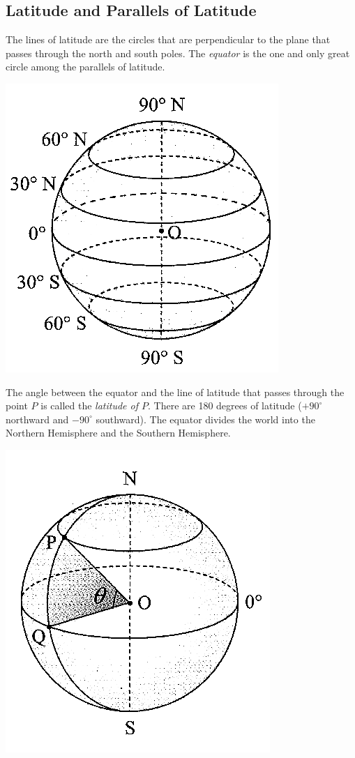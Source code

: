 \documentclass{report}
\begin{document}
\begin{multicols}{2}
    \subsection*{Latitude and Parallels of Latitude}

    The lines of latitude are the circles that are perpendicular to the plane that
    passes through the north and south poles. The \emph{equator} is the one and
    only great circle among the parallels of latitude.

    \begin{center}
        \includegraphics[scale=1.3]{latitude}
    \end{center}

    The angle between the equator and the line of latitude that passes through the
    point $P$ is called the \emph{latitude of $P$}. There are 180 degrees of
    latitude ($+90^\circ$ northward and $-90^\circ$ southward). The equator divides
    the world into the Northern Hemisphere and the Southern Hemisphere.

    \begin{center}
        \includegraphics[scale=1.3]{latitude 2.png}
    \end{center}


\end{multicols}
\end{document}
